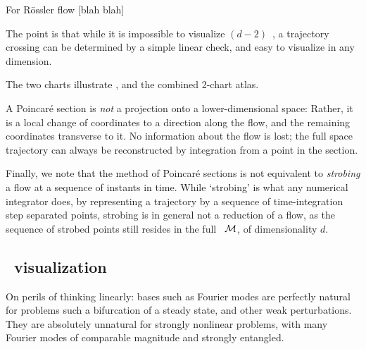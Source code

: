    \ifdraft\color{blue}

For R\"ossler flow 
[blah blah]

The point is that while it is impossible to visualize  $(d\!-\!2)$\dmn\
{\poincBord}, a trajectory crossing can be determined by a simple linear
check, and easy to visualize in any dimension.


The two charts
 illustrate \poincBord,
and \reffigs{fig:RoessBothEq} the combined 2-chart atlas.

    \color{black}\fi

A Poincar\'e section is {\em not} a projection onto a lower-dimensional
space: Rather, it is a local change of coordinates to a direction along
the flow, and the remaining coordinates transverse
to it. No information about the flow is lost; the full space trajectory
can always be reconstructed by integration from a point in the
section.

Finally, we note that the method of Poincar\'e sections is {not}
equivalent to \emph{strobing} a flow at a sequence of instants in time.
While `strobing' is what any numerical integrator does, by representing a
trajectory by a sequence of time-integration step separated points,
strobing is in general not a reduction of a flow, as the sequence of
strobed points still resides in the full \statesp\ ${\cal M}$, of
dimensionality $d$.

    \ifdraft\color{blue}
\subsection{\Statesp\ visualization}

On perils of thinking linearly: bases such as Fourier modes are
perfectly natural for problems such a bifurcation of a steady state, and
other weak perturbations. They are absolutely unnatural for strongly
nonlinear problems, with many Fourier modes of comparable magnitude and
strongly entangled.


